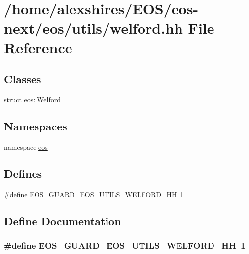 \hypertarget{welford_8hh}{
\section{/home/alexshires/EOS/eos-\/next/eos/utils/welford.hh File Reference}
\label{welford_8hh}
}
\subsection*{Classes}
\begin{DoxyCompactItemize}
\item 
struct \hyperlink{structeos_1_1Welford}{eos::Welford}
\end{DoxyCompactItemize}
\subsection*{Namespaces}
\begin{DoxyCompactItemize}
\item 
namespace \hyperlink{namespaceeos}{eos}
\end{DoxyCompactItemize}
\subsection*{Defines}
\begin{DoxyCompactItemize}
\item 
\#define \hyperlink{welford_8hh_ac70488a5220043c891e5f20ba1006fb3}{EOS\_\-GUARD\_\-EOS\_\-UTILS\_\-WELFORD\_\-HH}~1
\end{DoxyCompactItemize}


\subsection{Define Documentation}
\hypertarget{welford_8hh_ac70488a5220043c891e5f20ba1006fb3}{
\subsubsection[{EOS\_\-GUARD\_\-EOS\_\-UTILS\_\-WELFORD\_\-HH}]{\setlength{\rightskip}{0pt plus 5cm}\#define EOS\_\-GUARD\_\-EOS\_\-UTILS\_\-WELFORD\_\-HH~1}}
\label{welford_8hh_ac70488a5220043c891e5f20ba1006fb3}
